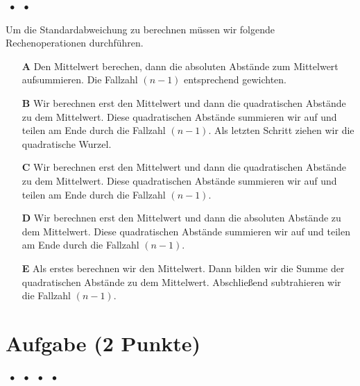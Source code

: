 \documentclass[a4paper, 9pt]{scrartcl}\usepackage[]{graphicx}\usepackage[]{xcolor}
\begin{document}
\ifcollection
\begin{flushright}
\tiny\vspace{-2Ex}
\textbf{\examinhaltstart}
\exammodulemathstat $\;\bullet$
\exammodulestat $\;\bullet$
\exammodulestatbbv 
\vspace{-1Ex}
\end{flushright}
\fi




Um die Standardabweichung zu berechnen müssen wir folgende Rechenoperationen durchführen.



\begin{enumerate}
\item [\textbf{A} \msquare] Den Mittelwert berechen, dann die absoluten Abstände zum Mittelwert aufsummieren. Die Fallzahl $(n-1)$ entsprechend gewichten.
\item [\textbf{B} \msquare] Wir berechnen erst den Mittelwert und dann die quadratischen Abstände zu dem Mittelwert. Diese quadratischen Abstände summieren wir auf und teilen am Ende durch die Fallzahl $(n-1)$. Als letzten Schritt ziehen wir die quadratische Wurzel.
\item [\textbf{C} \msquare] Wir berechnen erst den Mittelwert und dann die quadratischen Abstände zu dem Mittelwert. Diese quadratischen Abstände summieren wir auf und teilen am Ende durch die Fallzahl $(n-1)$.
\item [\textbf{D} \msquare] Wir berechnen erst den Mittelwert und dann die absoluten Abstände zu dem Mittelwert. Diese quadratischen Abstände summieren wir auf und teilen am Ende durch die Fallzahl $(n-1)$.
\item [\textbf{E} \msquare] Als erstes berechnen wir den Mittelwert. Dann bilden wir die Summe der quadratischen Abstände zu dem Mittelwert. Abschließend subtrahieren wir die Fallzahl $(n-1)$.
\end{enumerate} 

\section{Aufgabe \hfill (2 Punkte)}

\ifcollection
\begin{flushright}
\tiny\vspace{-2Ex}
\textbf{\examinhaltstart}
\exammodulemathstat $\;\bullet$
\exammodulestat $\;\bullet$
\exammodulestatbbv $\;\bullet$
\exammodulestatversuch $\;\bullet$
\exammodulebiostat
\vspace{-1Ex}
\end{flushright}
\fi
\end{document}
